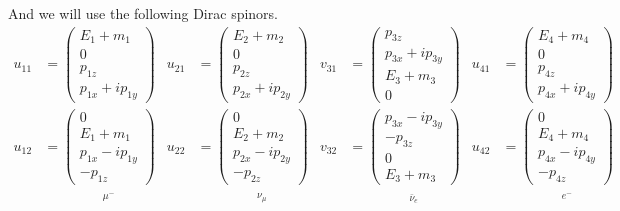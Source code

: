 \documentclass[12pt]{article}
\begin{document}
\noindent
And we will use the following Dirac spinors.
\begin{align*}
u_{11}&=\begin{pmatrix}E_1+m_1\\0\\p_{1z}\\p_{1x}+ip_{1y}\end{pmatrix}
&
u_{21}&=\begin{pmatrix}E_2+m_2\\0\\p_{2z}\\p_{2x}+ip_{2y}\end{pmatrix}
&
v_{31}&=\begin{pmatrix}p_{3z}\\p_{3x}+ip_{3y}\\E_3+m_3\\0\end{pmatrix}
&
u_{41}&=\begin{pmatrix}E_4+m_4\\0\\p_{4z}\\p_{4x}+ip_{4y}\end{pmatrix}
\\[2ex]
u_{12}&=
\underset{\substack{\\[1ex] \mu^-}}
{\begin{pmatrix}0\\E_1+m_1\\p_{1x}-ip_{1y}\\-p_{1z}\end{pmatrix}}
&
u_{22}&=
\underset{\substack{\\[1ex] \nu_\mu}}
{\begin{pmatrix}0\\E_2+m_2\\p_{2x}-ip_{2y}\\-p_{2z}\end{pmatrix}}
&
v_{32}&=
\underset{\substack{\\[1ex] \bar{\nu}_e}}
{\begin{pmatrix}p_{3x}-ip_{3y}\\-p_{3z}\\0\\E_3+m_3\end{pmatrix}}
&
u_{42}&=
\underset{\substack{\\[1ex] e^-}}
{\begin{pmatrix}0\\E_4+m_4\\p_{4x}-ip_{4y}\\-p_{4z}\end{pmatrix}}
\end{align*}
\end{document}
